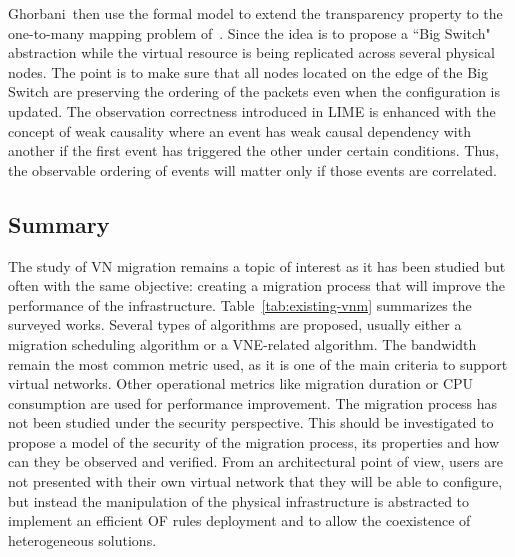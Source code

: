 Ghorbani~\etal then use the formal model to extend the transparency property to the one-to-many mapping problem of~\cite{toward-Ghorbani2014}.
Since the idea is to propose a ``Big Switch" abstraction while  the virtual resource is being replicated across several physical nodes. The point is to make sure that all nodes located on the edge of the Big Switch are preserving the ordering of the packets even when the configuration is updated.
The observation correctness introduced in LIME is enhanced with the concept of weak causality where an event has weak causal dependency with another if the first event has triggered the other under certain conditions.
Thus, the observable ordering of events will matter only if those events are correlated.


\subsection{Summary}
The study of VN migration remains a topic of interest as it has been studied but often with the same objective: creating a migration process that will improve the performance of the infrastructure. 
Table~\ref{tab:existing-vnm} summarizes the surveyed works. Several types of algorithms are proposed, usually either a migration scheduling algorithm or a VNE-related algorithm. 
The bandwidth remain the most common metric used, as it is one of the main criteria to support virtual networks. Other operational metrics like migration duration or CPU consumption are used for performance improvement.
The migration process has not been studied under the security perspective.
This should be investigated to propose a model of the security of the migration process, its properties and how can they be observed and verified. From an architectural point of view, users are not presented with their own virtual network that they will be able to configure, but instead the manipulation of the physical infrastructure is abstracted to implement an efficient OF rules deployment and to allow the coexistence of heterogeneous solutions.

